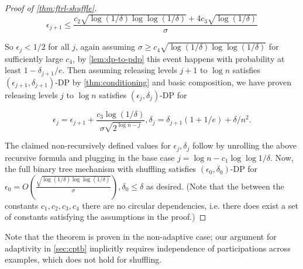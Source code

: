 \begin{proof}[Proof of \cref{thm:ftrl-shuffle}]
\[\epsilon_{j+1} \leq \frac{c_2 \sqrt{\log(1/\delta) \log \log(1/\delta)} + 4c_3 \sqrt{\log(1/\delta)}}{\sigma}\]

So $\epsilon_j < 1/2$ for all $j$, again assuming $\sigma \geq c_4 \sqrt{\log(1/\delta) \log \log(1/\delta)}$ for sufficiently large $c_4$, by \cref{lem:dp-to-pdp} this event happens with probability at least $1 - \delta_{j+1} / e$. Then assuming releasing levels $j+1$ to $\log n$ satisfies $(\epsilon_{j+1}, \delta_{j+1})$-DP by \cref{thm:conditioning} and basic composition, we have proven releasing levels $j$ to $\log n$ satisfies $(\epsilon_j, \delta_j)$-DP for

\[\epsilon_j = \epsilon_{j+1} + \frac{c_3 \log(1/\delta)}{\sigma \sqrt{2^{\log n - j}}}, \delta_j = \delta_{j+1}(1 + 1/e) + \delta / n^2.\]

The claimed non-recursively defined values for $\epsilon_j, \delta_j$ follow by unrolling the above recursive formula and plugging in the base case $j = \log n - c_1 \log \log 1/\delta$. 
Now, the full binary tree mechanism with shuffling satisfies $(\epsilon_0, \delta_0)$-DP for $\epsilon_0 = O\left(\frac{ \sqrt{\log(1/\delta) \log \log(1/\delta)}}{\sigma}\right), \delta_0 \leq \delta$ as desired. (Note that the between the constants $c_1, c_2, c_3, c_4$ there are no circular dependencies, i.e. there does exist a set of constants satisfying the assumptions in the proof.)
\end{proof}

Note that the theorem is proven in the non-adaptive case; our argument for adaptivity in \cref{sec:cptb} implicitly requires independence of participations across examples, which does not hold for shuffling.

